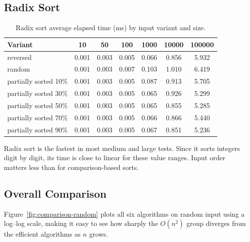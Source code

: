 \documentclass[11pt,a4paper]{article}
\begin{document}
\subsection{Radix Sort}
\begin{table}[H]
\centering
\begin{tabular}{lcccccc}
\toprule
Variant & 10 & 50 & 100 & 1000 & 10000 & 100000 \\
\midrule
reversed & 0.001 & 0.003 & 0.005 & 0.066 & 0.856 & 5.932 \\
random & 0.001 & 0.003 & 0.007 & 0.103 & 1.010 & 6.419 \\
partially sorted 10\% & 0.001 & 0.003 & 0.005 & 0.087 & 0.913 & 5.705 \\
partially sorted 30\% & 0.001 & 0.003 & 0.005 & 0.065 & 0.926 & 5.299 \\
partially sorted 50\% & 0.001 & 0.003 & 0.005 & 0.065 & 0.855 & 5.285 \\
partially sorted 70\% & 0.001 & 0.003 & 0.005 & 0.066 & 0.866 & 5.440 \\
partially sorted 90\% & 0.001 & 0.003 & 0.005 & 0.067 & 0.851 & 5.236 \\
\bottomrule
\end{tabular}
\caption{Radix sort average elapsed time (ms) by input variant and size.}
\label{tab:radix-results}
\end{table}

Radix sort is the fastest in most medium and large tests. Since it sorts integers digit by digit, its time is close to linear for these value ranges. Input order matters less than for comparison-based sorts.

\subsection{Overall Comparison}

Figure~\ref{fig:comparison-random} plots all six algorithms on random input using a log--log scale, making it easy to see how sharply the $O(n^2)$ group diverges from the efficient algorithms as $n$ grows.
\end{document}
